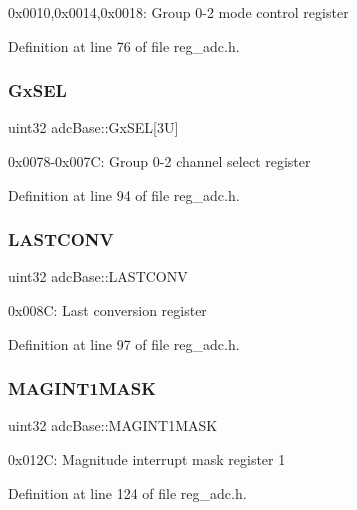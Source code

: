0x0010,0x0014,0x0018\+: Group 0-\/2 mode control register 

Definition at line 76 of file reg\+\_\+adc.\+h.

\mbox{\label{structadcBase_abe57fd7b19c1cf1882361821a2a4aa70}} 
\subsubsection{\texorpdfstring{Gx\+S\+EL}{GxSEL}}
{\footnotesize\ttfamily uint32 adc\+Base\+::\+Gx\+S\+EL\mbox{[}3\+U\mbox{]}}

0x0078-\/0x007C\+: Group 0-\/2 channel select register 

Definition at line 94 of file reg\+\_\+adc.\+h.

\mbox{\label{structadcBase_a3aec3d5bb163ce998aee14b5fc8f2205}} 
\subsubsection{\texorpdfstring{L\+A\+S\+T\+C\+O\+NV}{LASTCONV}}
{\footnotesize\ttfamily uint32 adc\+Base\+::\+L\+A\+S\+T\+C\+O\+NV}

0x008C\+: Last conversion register 

Definition at line 97 of file reg\+\_\+adc.\+h.

\mbox{\label{structadcBase_a93f32d86cf47ed5c4a9e92fc9ada7ef8}} 
\subsubsection{\texorpdfstring{M\+A\+G\+I\+N\+T1\+M\+A\+SK}{MAGINT1MASK}}
{\footnotesize\ttfamily uint32 adc\+Base\+::\+M\+A\+G\+I\+N\+T1\+M\+A\+SK}

0x012C\+: Magnitude interrupt mask register 1 

Definition at line 124 of file reg\+\_\+adc.\+h.

\mbox{\label{structadcBase_abdb0020dc58ba204b2b412cc5125b849}} 
